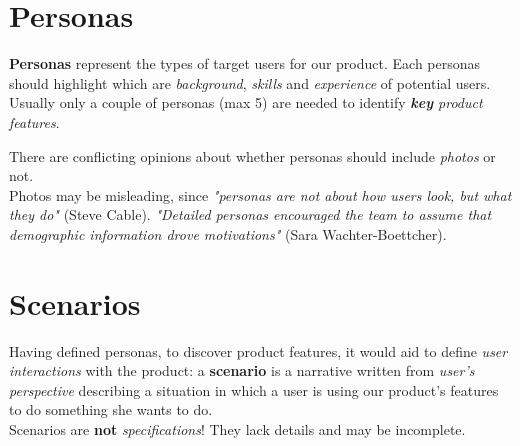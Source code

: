 \section{Personas}
\textbf{Personas} represent the types of target users for our product.
Each personas should highlight which are \textit{background}, \textit{skills} and \textit{experience} of potential users.
Usually only a couple of personas (max 5) are needed to identify \textit{\textbf{key} product features}.
\nl

\begin{center}
\end{center}

There are conflicting opinions about whether personas should include \textit{photos} or not.\\
Photos may be misleading, since \textit{"personas are not about how users look, but what they do"} (Steve Cable).
\textit{"Detailed personas encouraged the team to assume that demographic information drove motivations"} (Sara Wachter-Boettcher).

\section{Scenarios}
Having defined personas, to discover product features, it would aid to define \textit{user interactions} with the product:
a \textbf{scenario} is a narrative written from \textit{user's perspective} describing a situation in which a user is using our product's features to do something she wants to do.\\
Scenarios are \textbf{not} \textit{specifications}!
They lack details and may be incomplete.

